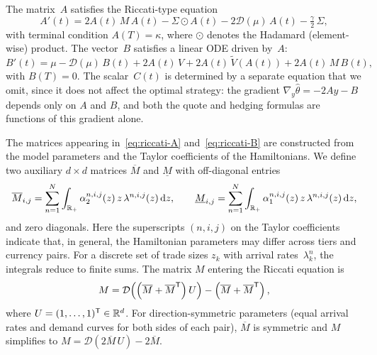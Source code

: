 The matrix~$A$ satisfies the Riccati-type equation
\begin{equation}
  \label{eq:riccati-A}
  A'(t) = 2A(t)\,M\,A(t) - \Sigma \odot A(t) - 2\mathcal{D}(\mu)\,A(t) - \tfrac{\gamma}{2}\,\Sigma,
\end{equation}
with terminal condition $A(T) = \kappa$, where $\odot$ denotes the Hadamard (element-wise) product. The vector~$B$ satisfies a linear ODE driven by~$A$:
\begin{equation}
  \label{eq:riccati-B}
  B'(t) = \mu - \mathcal{D}(\mu)\,B(t) + 2A(t)\,V + 2A(t)\,\tilde{V}(A(t)) + 2A(t)\,M\,B(t),
\end{equation}
with $B(T) = 0$. The scalar~$C(t)$ is determined by a separate equation that we omit, since it does not affect the optimal strategy: the gradient $\nabla_y\hat\theta = -2Ay - B$ depends only on $A$ and $B$, and both the quote and hedging formulas are functions of this gradient alone.

The matrices appearing in~\eqref{eq:riccati-A} and~\eqref{eq:riccati-B} are constructed from the model parameters and the Taylor coefficients of the Hamiltonians. We define two auxiliary $d \times d$ matrices $\overline{M}$ and $\underline{M}$ with off-diagonal entries
\begin{equation}
  \label{eq:M-bar-underline}
  \overline{M}_{i,j} = \sum_{n=1}^{N} \int_{\mathbb{R}_+} \alpha_2^{n,i,j}(z)\,z\,\lambda^{n,i,j}(z)\,\mathrm{d} z, \qquad
  \underline{M}_{i,j} = \sum_{n=1}^{N} \int_{\mathbb{R}_+} \alpha_1^{n,i,j}(z)\,z\,\lambda^{n,i,j}(z)\,\mathrm{d} z,
\end{equation}
and zero diagonals. Here the superscripts $(n,i,j)$ on the Taylor coefficients indicate that, in general, the Hamiltonian parameters may differ across tiers and currency pairs. For a discrete set of trade sizes $z_k$ with arrival rates~$\lambda_k^n$, the integrals reduce to finite sums. The matrix $M$ entering the Riccati equation is
\begin{equation}
  \label{eq:M-def}
  M = \mathcal{D}\!\left(\left(\overline{M} + \overline{M}^{\mathsf{T}}\right) U\right) - \left(\overline{M} + \overline{M}^{\mathsf{T}}\right),
\end{equation}
where $U = (1, \ldots, 1)^{\mathsf{T}} \in \mathbb{R}^d$. For direction-symmetric parameters (equal arrival rates and demand curves for both sides of each pair), $\overline{M}$ is symmetric and $M$ simplifies to $M = \mathcal{D}(2\overline{M}\,U) - 2\overline{M}$.

